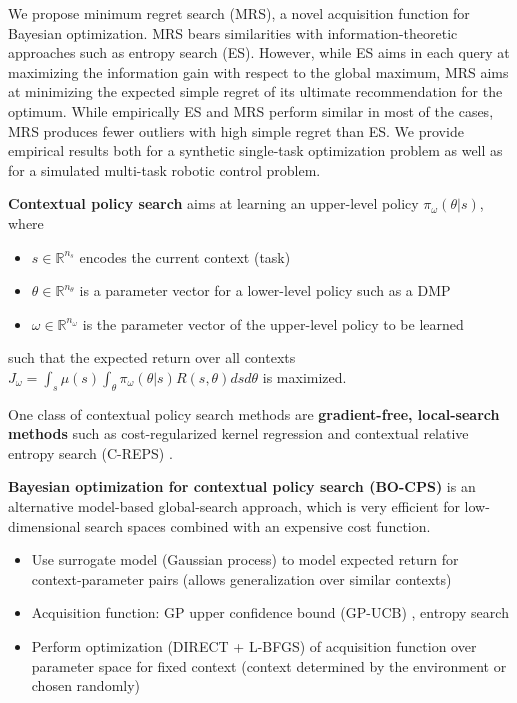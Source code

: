 

\begin{block}{}
\justifying
We propose minimum regret search (MRS), a novel acquisition function for Bayesian
optimization. MRS bears similarities with information-theoretic approaches
such as entropy search (ES). However, while ES aims in each query at maximizing the
information gain with respect to the global maximum, MRS aims at minimizing the
expected simple regret of its ultimate recommendation for the optimum. While empirically ES and MRS perform similar in most of the
cases, MRS produces fewer outliers with high simple regret than ES. We provide empirical
results both for a synthetic single-task optimization problem as well as for a
simulated multi-task robotic control problem.
\end{block}

\begin{block}{}
\textbf{Contextual policy search} \cite{deisenroth_survey_2013} aims at learning an upper-level policy $\pi_\omega(\theta \vert s)$, where
\begin{itemize}
 \item $s \in \mathbb{R}^{n_s}$ encodes the current context (task)
 \item $\theta \in \mathbb{R}^{n_\theta}$ is a parameter vector for a lower-level policy such as a DMP \cite{ijspeert_dynamical_2013}
 \item $\omega \in \mathbb{R}^{n_\omega}$ is the parameter vector of the upper-level policy to be learned
\end{itemize}
such that the expected return over all contexts $J_\omega = \int_s \mu(s) \int_\theta \pi_\omega(\theta \vert s) R(s, \theta) ds d\theta$ is maximized.

One class of contextual policy search methods are \textbf{gradient-free, local-search methods} such as cost-regularized kernel regression \cite{Kober2012} and contextual relative entropy search (C-REPS) \cite{kupcsik_data-efficient_2013}.

\textbf{Bayesian optimization for contextual policy search (BO-CPS)} \cite{metzen_bayesian_2015} is an alternative model-based global-search approach, which is very efficient for low-dimensional search spaces combined with an expensive cost function.
\begin{itemize}
 \item Use surrogate model (Gaussian process) to model expected return for context-parameter pairs (allows generalization over similar contexts)
 \item Acquisition function: GP upper confidence bound (GP-UCB) \cite{srinivas_gaussian_2010}, entropy search \cite{hennig_entropy_2012}
 \item Perform optimization (DIRECT + L-BFGS) of acquisition function over parameter space for fixed context (context determined by the environment or chosen randomly)
\end{itemize}

\end{block}

